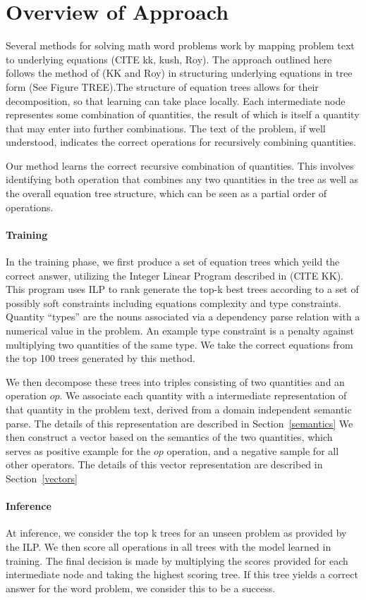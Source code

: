 \section{Overview of Approach}
Several methods for solving math word problems work by mapping problem text to underlying equations (CITE kk, kush, Roy). 
The approach outlined here follows the method of (KK and Roy) in structuring underlying equations in tree form (See Figure TREE).The structure of equation trees allows for their decomposition, so that learning can take place locally. 
Each intermediate node representes some combination of quantities, the result of which is itself a quantity that may enter into further combinations. 
The text of the problem, if well understood, indicates the correct operations for recursively combining quantities. 

Our method learns the correct recursive combination of quantities.
This involves identifying both operation that combines any two quantities in the tree as well as the overall equation tree structure, which can be seen as a partial order of operations. 

\paragraph{Training}
In the training phase, we first produce a set of equation trees which yeild the correct answer, utilizing the Integer Linear Program described in (CITE KK). 
This program uses ILP to rank generate the top-k best trees according to a set of possibly soft constraints including equations complexity and type constraints.
Quantity ``types'' are the nouns associated via a dependency parse relation with a numerical value in the problem.
An example type constraint is a penalty against multiplying two quantities of the same type. 
We take the correct equations from the top 100 trees generated by this method.

We then decompose these trees into triples consisting of two quantities and an operation $op$. 
We associate each quantity with a intermediate representation of that quantity in the problem text, derived from a domain independent semantic parse. 
The details of this representation are described in Section~\ref{semantics}
We then construct a vector based on the semantics of the two quantities, which serves as positive example for the $op$ operation, and a negative sample for all other operators. 
The details of this vector representation are described in Section~\ref{vectors}

\paragraph{Inference} At inference, we consider the top k trees for an unseen problem as provided by the ILP. 
We then score all operations in all trees with the model learned in training.
The final decision is made by multiplying the scores provided for each intermediate node and taking the highest scoring tree. 
If this tree yields a correct answer for the word problem, we consider this to be a success. 
